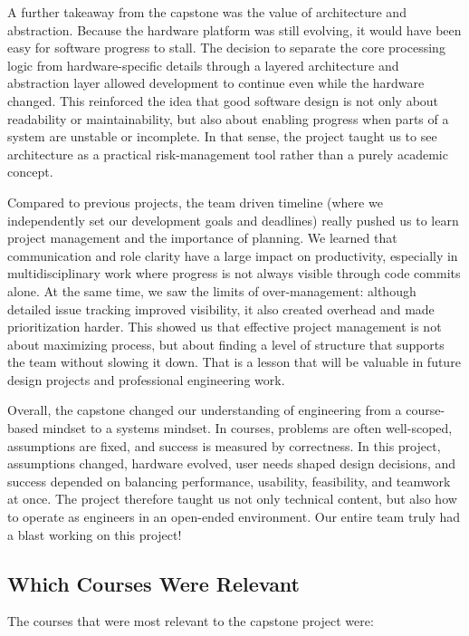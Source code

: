 \documentclass{article}
\begin{document}
A further takeaway from the capstone was the value of architecture and 
abstraction. Because the hardware platform was still evolving, it would have 
been easy for software progress to stall. The decision to separate the core 
processing logic from hardware-specific details through a layered architecture 
and abstraction layer allowed development to continue even while the hardware 
changed. This reinforced the idea that good software design is not only about 
readability or maintainability, but also about enabling progress when parts 
of a system are unstable or incomplete. In that sense, the project taught us 
to see architecture as a practical risk-management tool rather than a purely 
academic concept.

Compared to previous projects, the team driven timeline (where we independently 
set our development goals and deadlines) really pushed us to learn project 
management and the importance of planning. We learned that communication and 
role clarity have a large impact on productivity, especially in 
multidisciplinary work where progress is not always visible through code commits
 alone. At the same time, we saw the limits of over-management: although 
detailed issue tracking improved visibility, it also created overhead and made 
prioritization harder. This showed us that effective project management is not 
about maximizing process, but about finding a level of structure that supports 
the team without slowing it down. That is a lesson that will be valuable in 
future design projects and professional engineering work.

Overall, the capstone changed our understanding of engineering from a 
course-based mindset to a systems mindset. In courses, problems are often 
well-scoped, assumptions are fixed, and success is measured by correctness. 
In this project, assumptions changed, hardware evolved, user needs shaped 
design decisions, and success depended on balancing performance, usability, 
feasibility, and teamwork at once. The project therefore taught us not only 
technical content, but also how to operate as engineers in an open-ended 
environment. Our entire team truly had a blast working on this project! 

\subsection{Which Courses Were Relevant}

The courses that were most relevant to the capstone project were:
\end{document}
